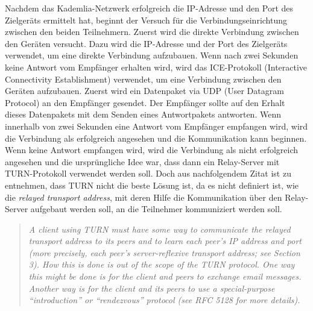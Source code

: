 Nachdem das Kademlia-Netzwerk erfolgreich die IP-Adresse und den Port des Zielgeräts ermittelt hat, beginnt der Versuch für die Verbindungseinrichtung zwischen den beiden Teilnehmern. Zuerst wird die direkte Verbindung zwischen den Geräten versucht. Dazu wird die IP-Adresse und der Port des Zielgeräts verwendet, um eine direkte Verbindung aufzubauen. Wenn nach zwei Sekunden keine Antwort vom Empfänger erhalten wird, wird das ICE-Protokoll (Interactive Connectivity Establishment) verwendet, um eine Verbindung zwischen den Geräten aufzubauen. 
Zuerst wird ein Datenpaket via UDP (User Datagram Protocol) an den Empfänger gesendet. Der Empfänger sollte auf den Erhalt dieses Datenpakets mit dem Senden eines Antwortpakets antworten. Wenn innerhalb von zwei Sekunden eine Antwort vom Empfänger empfangen wird, wird die Verbindung als erfolgreich angesehen und die Kommunikation kann beginnen. Wenn keine Antwort empfangen wird, wird die Verbindung als nicht erfolgreich angesehen und die ursprüngliche Idee war, dass dann ein Relay-Server mit TURN-Protokoll verwendet werden soll. Doch aus nachfolgendem Zitat ist zu entnehmen, dass TURN nicht die beste Lösung ist, da es nicht definiert ist, wie die \textit{relayed transport address}, mit deren Hilfe die Kommunikation über den Relay-Server aufgebaut werden soll, an die Teilnehmer kommuniziert werden soll.

\begin{quote}
    \textit{A client using TURN must have some way to communicate the relayed transport address to its
    peers and to learn each peer's IP address and port (more precisely, each peer's server-reflexive
    transport address; see Section 3). How this is done is out of the scope of the TURN protocol. One
    way this might be done is for the client and peers to exchange email messages. Another way is
    for the client and its peers to use a special-purpose \enquote{introduction} or \enquote{rendezvous} protocol (see RFC 5128
    for more details).} \parencite[S. 7]{rfc8656_TURN}
\end{quote}



